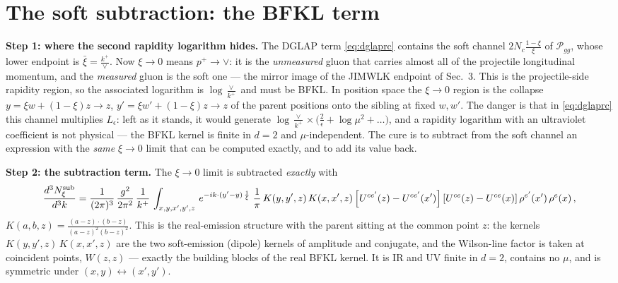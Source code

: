 \documentclass[10pt]{article}
\newcommand{\Leps}{L_{\epsilon}}
\begin{document}
\section{The soft subtraction: the BFKL term}
\textbf{Step 1: where the second rapidity logarithm hides.}
The DGLAP term \eqref{eq:dglaprc} contains the soft channel $2N_{c}\frac{1-\xi}{\xi}$ of
$\mathcal P_{gg}$, whose lower endpoint is $\bar\xi=\frac{k^{+}}{\vee}$. Now $\xi\to0$ means
$p^{+}\to\vee$: it is the \emph{unmeasured} gluon that carries almost all of the projectile
longitudinal momentum, and the \emph{measured} gluon is the soft one --- the mirror image of the
JIMWLK endpoint of Sec.~3. This is the projectile-side rapidity region, so the associated
logarithm is $\log\frac{\vee}{k^{+}}$ and must be BFKL. In position space the $\xi\to0$ region is
the collapse $y=\xi w+(1-\xi)z\to z$, $y'=\xi w'+(1-\xi)z\to z$ of the parent positions onto the
sibling at fixed $w,w'$. The danger is that in \eqref{eq:dglaprc} this channel multiplies
$\Leps$: left as it stands, it would generate
$\log\frac{\vee}{k^{+}}\times\big(\frac{2}{\epsilon}+\log\mu^{2}+\dots\big)$, and a rapidity
logarithm with an ultraviolet coefficient is not physical --- the BFKL kernel is finite in $d=2$
and $\mu$-independent. The cure is to subtract from the soft channel an expression with the
\emph{same} $\xi\to0$ limit that can be computed exactly, and to add its value back.

\textbf{Step 2: the subtraction term.} The $\xi\to0$ limit is subtracted \emph{exactly} with
\begin{align}\label{eq:sub}
\frac{d^{3}N^{\rm sub}_{\xi}}{d^{3}k} = \frac{1}{(2\pi)^{3}}\, \frac{g^{2}}{2\pi^{2}}\, \frac{1}{k^{+}}\,\int_{x,y,x',y',z}\, e^{-ik\cdot (y'-y)\,\frac{1}{\xi}}\;\frac{1}{\pi}\,K(y,y',z)\,K(x,x',z)
\left[U^{ce'}(z) - U^{ce'}(x')\right]\left[U^{ce}(z) - U^{ce}(x)\right]\rho^{e'}(x')\,\rho^{e}(x)\,,
\end{align}
$K(a,b,z)=\frac{(a-z)\cdot(b-z)}{(a-z)^{2}(b-z)^{2}}$. This is the real-emission structure with
the parent sitting at the common point $z$: the kernels $K(y,y',z)\,K(x,x',z)$ are the two
soft-emission (dipole) kernels of amplitude and conjugate, and the Wilson-line factor is taken at
coincident points, $W(z,z)$ --- exactly the building blocks of the real BFKL kernel. It is IR and
UV finite in $d=2$, contains no $\mu$, and is symmetric under $(x,y)\leftrightarrow(x',y')$.
\end{document}
